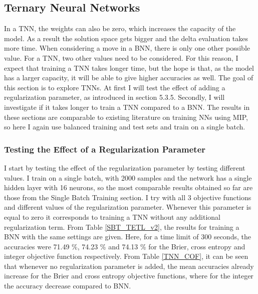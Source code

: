 


\subsection{Ternary Neural Networks}
\noindent In a TNN, the weights can also be zero, which increases the capacity of the model. As a result the solution space gets bigger and the delta evaluation takes more time. When considering a move in a BNN, there is only one other possible value. For a TNN, two other values need to be considered. For this reason, I expect that training a TNN takes longer time, but the hope is that, as the model has a larger capacity, it will be able to give higher accuracies as well. The goal of this section is to explore TNNs. At first I will test the effect of adding a regularization parameter, as introduced in section 5.3.5. Secondly, I will investigate if it takes longer to train a TNN compared to a BNN. The results in these sections are comparable to existing literature on training NNs using MIP, so here I again use balanced training and test sets and train on a single batch.


\subsubsection{Testing the Effect of a Regularization Parameter}

I start by testing the effect of the regularization parameter by testing different values. I train on a single batch, with 2000 samples and the network has a single hidden layer with 16 neurons, so the most comparable results obtained so far are those from the Single Batch Training section. I try with all 3 objective functions and different values of the regularization parameter. Whenever this parameter is equal to zero it corresponds to training a TNN without any additional regularization term. From Table \ref{SBT_TETL_v2}, the results for training a BNN with the same settings are given. Here, for a time limit of 300 seconds, the accuracies were 71.49 \%, 74.23 \% and 74.13 \% for the Brier, cross entropy and integer objective function respectively. From Table \ref{TNN_COF}, it can be seen that whenever no regularization parameter is added, the mean accuracies already increase for the Brier and cross entropy objective functions, where for the integer the accuracy decrease compared to BNN. \\

